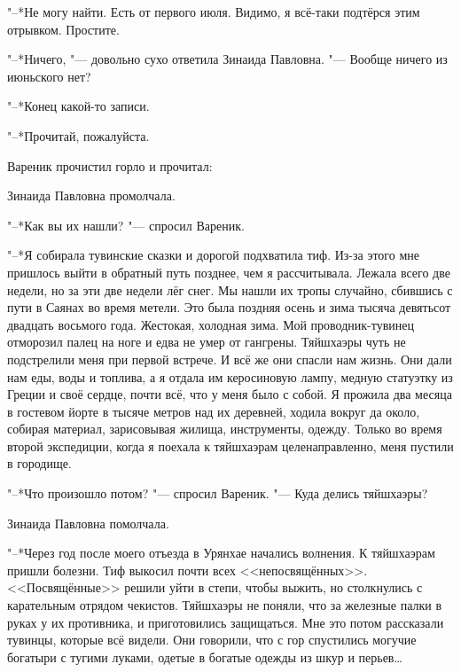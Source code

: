 "--*Не могу найти.
Есть от первого июля.
Видимо, я всё-таки подтёрся этим отрывком.
Простите.

"--*Ничего, "--- довольно сухо ответила Зинаида Павловна.
"--- Вообще ничего из июньского нет?

"--*Конец какой-то записи.

"--*Прочитай, пожалуйста.

Вареник прочистил горло и прочитал:


Зинаида Павловна промолчала.

"--*Как вы их нашли? "--- спросил Вареник.

"--*Я собирала тувинские сказки и дорогой подхватила тиф.
Из-за этого мне пришлось выйти в обратный путь позднее, чем я рассчитывала.
Лежала всего две недели, но за эти две недели лёг снег.
Мы нашли их тропы случайно, сбившись с пути в Саянах во время метели.
Это была поздняя осень и зима тысяча девятьсот двадцать восьмого года.
Жестокая, холодная зима.
Мой проводник-тувинец отморозил палец на ноге и едва не умер от гангрены.
Тяйшхаэры чуть не подстрелили меня при первой встрече.
И всё же они спасли нам жизнь.
Они дали нам еды, воды и топлива, а я отдала им керосиновую лампу, медную статуэтку из Греции и своё сердце, почти всё, что у меня было с собой.
Я прожила два месяца в гостевом йорте в тысяче метров над их деревней, ходила вокруг да около, собирая материал, зарисовывая жилища, инструменты, одежду.
Только во время второй экспедиции, когда я поехала к тяйшхаэрам целенаправленно, меня пустили в городище.

"--*Что произошло потом? "--- спросил Вареник.
"--- Куда делись тяйшхаэры?

Зинаида Павловна помолчала.

"--*Через год после моего отъезда в Урянхае начались волнения.
К тяйшхаэрам пришли болезни.
Тиф выкосил почти всех <<непосвящённых>>.
<<Посвящённые>> решили уйти в степи, чтобы выжить, но столкнулись с карательным отрядом чекистов.
Тяйшхаэры не поняли, что за железные палки в руках у их противника, и приготовились защищаться.
Мне это потом рассказали тувинцы, которые всё видели.
Они говорили, что с гор спустились могучие богатыри с тугими луками, одетые в богатые одежды из шкур и перьев\ldots{}

